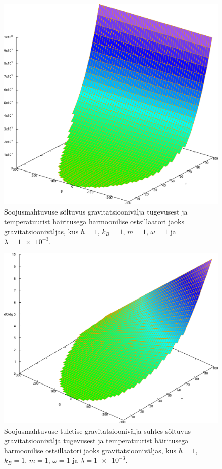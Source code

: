 \documentclass{trkut}%
\begin{document}
\begin{figure}[htb!]
    \includegraphics[width=\textwidth]{maxima/harh1k1m1w1l0001.pdf}
    \caption{Soojusmahtuvuse sõltuvus gravitatsioonivälja tugevusest ja temperatuurist häiritusega harmoonilise ostsillaatori jaoks gravitatsiooniväljas, kus $\hbar=1$, $k_B=1$, $m=1$, $\omega=1$ ja $\lambda=\num{1e-3}$.}
    \label{hjoon1}
\end{figure}

\begin{figure}[htb!]
    \includegraphics[width=\textwidth]{maxima/dcdgharh1k1m1w1l0001.pdf}
    \caption{Soojusmahtuvuse tuletise gravitatsioonivälja suhtes sõltuvus gravitatsioonivälja tugevusest ja temperatuurist häiritusega harmoonilise ostsillaatori jaoks gravitatsiooniväljas, kus $\hbar=1$, $k_B=1$, $m=1$, $\omega=1$ ja $\lambda=\num{1e-3}$.}
    \label{hjoon2}
\end{figure}
\end{document}
